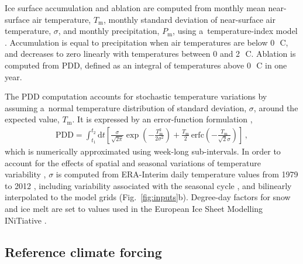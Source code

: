\documentclass[tc, manuscript]{copernicus}
\begin{document}
    Ice surface accumulation and ablation are computed from monthly mean
    near-surface air temperature, $T_{\mathrm{m}}$, monthly standard deviation
    of near-surface air temperature, $\sigma$, and monthly precipitation,
    $P_{\mathrm{m}}$, using a~temperature-index model
    \citep[e.g.,][]{Hock.2003}. Accumulation is equal to precipitation when air
    temperatures are below 0\,\unit{{\degree}C}, and decreases to zero linearly
    with temperatures between 0 and 2\,\unit{{\degree}C}. Ablation is computed
    from PDD, defined as an integral of temperatures above 0\,\unit{{\degree}C}
    in one year.

    The PDD computation accounts for stochastic temperature variations by
    assuming a~normal temperature distribution of standard deviation, $\sigma$,
    around the expected value, $T_{\mathrm{m}}$. It is expressed by an
    error-function formulation \citep{Calov.Greve.2005},
    \begin{align}
      {\text{PDD}} = \int_{t_1}^{t_2} \mathrm{d}t
        \left[\frac{\sigma}{\sqrt{2\pi}}
                \exp\left({-\frac{T_{\mathrm{m}}^2}{2\sigma^2}}\right)
              + \frac{T_{\mathrm{m}}}{2} \, {\text{erfc}}
                \left(-\frac{T_{\mathrm{m}}}{\sqrt{2}\sigma}\right)\right] \,,
    \end{align}
    which is numerically approximated using week-long sub-intervals. In
    order to account for the effects of spatial and seasonal variations of
    temperature variability \citep{Seguinot.2013}, $\sigma$ is computed
    from ERA-Interim daily temperature values from 1979 to 2012
    \citep{Mesinger.etal.2006}, including variability associated with the
    seasonal cycle \citep{Seguinot.2013}, and bilinearly interpolated to the
    model grids (Fig.~\ref{fig:inputs}b). Degree-day factors for snow and ice
    melt are set to values used in the European Ice Sheet Modelling INiTiative
    \citep[Table~\ref{tab:params}; EISMINT,][]{Huybrechts.1998}.


\subsection{Reference climate forcing}
\label{sec:atm}
\end{document}
